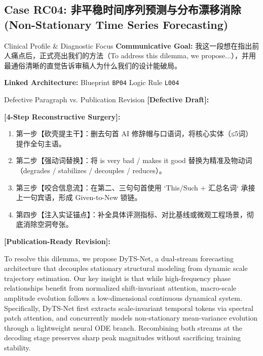 \subsection{Case RC04: 非平稳时间序列预测与分布漂移消除 (Non-Stationary Time Series Forecasting)}\label{case:RC04}
\begin{ConceptBox}{Clinical Profile \& Diagnostic Focus}
\textbf{Communicative Goal:} 我这一段想在指出前人痛点后，正式亮出我们的方法（To address this dilemma, we propose...），并用最通俗清晰的直觉告诉审稿人为什么我们的设计能破局。\par
\textbf{Linked Architecture:} Blueprint \texttt{BP04} \enspace\textbar\enspace Logic Rule \texttt{L004}
\end{ConceptBox}
\begin{ExampleBox}{Defective Paragraph vs. Publication Revision}
\textbf{\color{TargetHighlight}[Defective Draft]:}\par
{}\par\vspace{6pt}
\textbf{\color{AcadForest}[4-Step Reconstructive Surgery]:}
\begin{enumerate}[label=\textbf{\color{AcadNavy}Step \arabic*:}, leftmargin=2em]
  \item 第一步【砍壳提主干】：删去句首 AI 修辞帽与口语词，将核心实体（≤5词）提作全句主语。
  \item 第二步【强动词替换】：将 is very bad / makes it good 替换为精准及物动词（degrades / stabilizes / decouples / reduces）。
  \item 第三步【咬合信息流】：在第二、三句句首使用 `This/Such + 汇总名词` 承接上一句宾语，形成 Given-to-New 锁链。
  \item 第四步【注入实证锚点】：补全具体评测指标、对比基线或微观工程场景，彻底消除空洞夸张。
\end{enumerate}\vspace{4pt}
\textbf{\color{AcadNavy}[Publication-Ready Revision]:}\par
To resolve this dilemma, we propose DyTS-Net, a dual-stream forecasting architecture that decouples stationary structural modeling from dynamic scale trajectory estimation. Our key insight is that while high-frequency phase relationships benefit from normalized shift-invariant attention, macro-scale amplitude evolution follows a low-dimensional continuous dynamical system. Specifically, DyTS-Net first extracts scale-invariant temporal tokens via spectral patch attention, and concurrently models non-stationary mean-variance evolution through a lightweight neural ODE branch. Recombining both streams at the decoding stage preserves sharp peak magnitudes without sacrificing training stability.
\end{ExampleBox}

